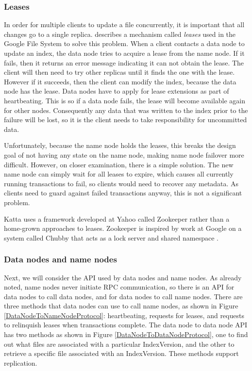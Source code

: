 \documentclass[a4paper,10pt]{article}
\begin{document}
\subsubsection{Leases}
In order for multiple clients to update a file concurrently, it is important that all changes go to a single replica. \cite{citeulike:300020} describes a mechanism called \emph{leases} used in the Google File System to solve this problem. When a client contacts a data node to update an index, the data node tries to acquire a lease from the name node. If it fails, then it returns an error message indicating it can not obtain the lease. The client will then need to try other replicas until it finds the one with the lease. However if it succeeds, then the client can modify the index, because the data node has the lease. Data nodes have to apply for lease extensions as part of heartbeating. This is so if a data node fails, the lease will become available again for other nodes. Consequently any data that was written to the index prior to the failure will be lost, so it is the client needs to take responsibility for uncommitted data. 

Unfortunately, because the name node holds the leases, this breaks the design goal of not having any state on the name node, making name node failover more difficult. However, on closer examination, there is a simple solution. The new name node can simply wait for all leases to expire, which causes all currently running transactions to fail, so clients would need to recover any metadata. As clients need to guard against failed transactions anyway, this is not a significant problem.

Katta \cite{katta} uses a framework developed at Yahoo called Zookeeper \cite{zookeeper} rather than a home-grown approaches to leases. Zookeeper is inspired by work at Google on a system called Chubby that acts as a lock server and shared namespace \cite{Bur06,paxos-live}. 

\subsubsection{Data nodes and name nodes}

Next, we will consider the API used by data nodes and name nodes. As already noted, name nodes never initiate RPC communication, so there is an API for data nodes to call data nodes, and for data nodes to call name nodes. There are three methods that data nodes can use to call name nodes, as shown in Figure \ref{DataNodeToNameNodeProtocol}: heartbeating, requests for leases, and requests to relinquish leases when transactions complete. The data node to data node API has two methods as shown in Figure \ref{DataNodeToDataNodeProtocol}, one to find out what files are associated with a particular IndexVersion, and the other to retrieve a specific file associated with an IndexVersion. These methods support replication.  
\end{document}
